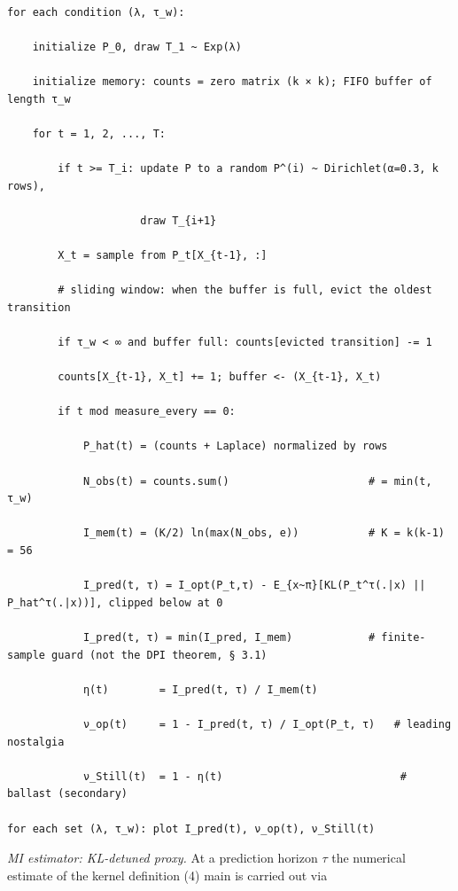 \documentclass[pdflatex,sn-mathphys-ay]{sn-jnl}
\begin{document}
\begingroup\footnotesize\linespread{1}\selectfont
\begin{Verbatim}[breaklines=true]

for each condition (λ, τ_w):

    initialize P_0, draw T_1 ~ Exp(λ)

    initialize memory: counts = zero matrix (k × k); FIFO buffer of length τ_w

    for t = 1, 2, ..., T:

        if t >= T_i: update P to a random P^(i) ~ Dirichlet(α=0.3, k rows),

                     draw T_{i+1}

        X_t = sample from P_t[X_{t-1}, :]

        # sliding window: when the buffer is full, evict the oldest transition

        if τ_w < ∞ and buffer full: counts[evicted transition] -= 1

        counts[X_{t-1}, X_t] += 1; buffer <- (X_{t-1}, X_t)

        if t mod measure_every == 0:

            P_hat(t) = (counts + Laplace) normalized by rows

            N_obs(t) = counts.sum()                      # = min(t, τ_w)

            I_mem(t) = (K/2) ln(max(N_obs, e))           # K = k(k-1) = 56

            I_pred(t, τ) = I_opt(P_t,τ) - E_{x~π}[KL(P_t^τ(.|x) || P_hat^τ(.|x))], clipped below at 0

            I_pred(t, τ) = min(I_pred, I_mem)            # finite-sample guard (not the DPI theorem, § 3.1)

            η(t)        = I_pred(t, τ) / I_mem(t)

            ν_op(t)     = 1 - I_pred(t, τ) / I_opt(P_t, τ)   # leading nostalgia

            ν_Still(t)  = 1 - η(t)                            # ballast (secondary)

for each set (λ, τ_w): plot I_pred(t), ν_op(t), ν_Still(t)

\end{Verbatim}
\endgroup



\emph{MI estimator: KL-detuned proxy.} At a prediction horizon \(\tau\) the numerical estimate of the kernel definition (4) main is carried out via
\end{document}
